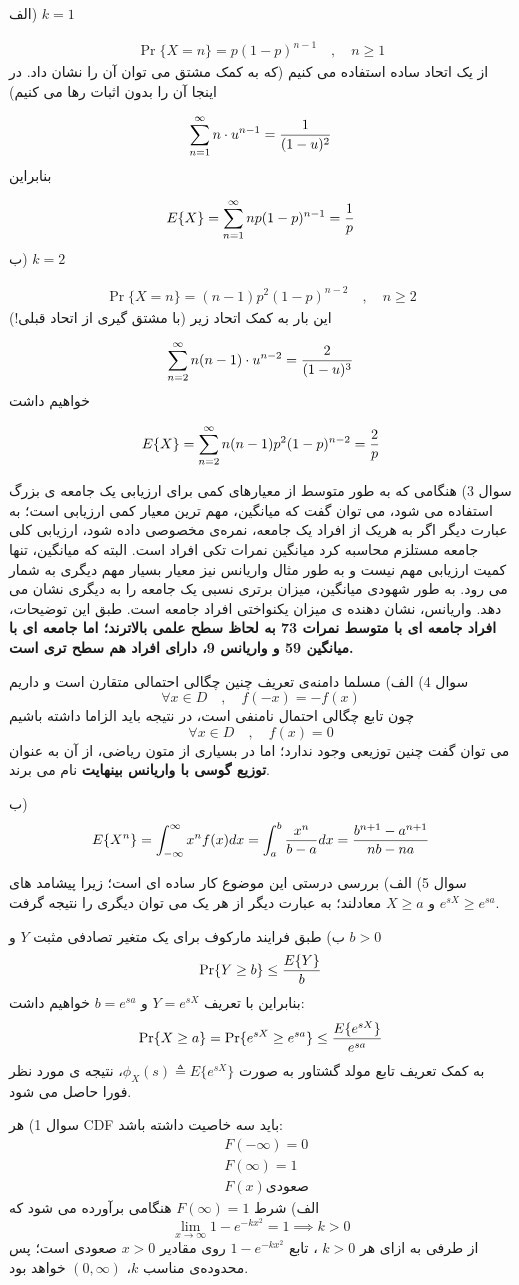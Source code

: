 \documentclass[10pt,letterpaper]{report}
\newcommand{\eqn}[1]{
\[\begin{split}
#1
\end{split}\]
}
\begin{document}
الف) $k=1$
\eqn{
\Pr\{X=n\}=p(1-p)^{n-1}\quad,\quad n\ge 1
}{}
از یک اتحاد ساده استفاده می کنیم (که به کمک مشتق می توان آن را نشان داد. در اینجا آن را بدون اثبات رها می کنیم)
\eqn{
\sum_{n=1}^\infty n\cdot u^{n-1}={1\over (1-u)^2}
}{}
بنابراین
\eqn{
E\{X\}=\sum_{n=1}^\infty np(1-p)^{n-1}={1\over p}
}{}
ب) $k=2$
\eqn{
\Pr\{X=n\}=(n-1)p^2(1-p)^{n-2}\quad,\quad n\ge 2
}{}
این بار به کمک اتحاد زیر (با مشتق گیری از اتحاد قبلی!)
\eqn{
\sum_{n=2}^\infty n(n-1)\cdot u^{n-2}={2\over (1-u)^3}
}{}
خواهیم داشت
\eqn{
E\{X\}=\sum_{n=2}^\infty n(n-1)p^2(1-p)^{n-2}={2\over p}
}{}

سوال 3) هنگامی که به طور متوسط از معیارهای کمی برای ارزیابی یک جامعه ی بزرگ استفاده می شود، می توان گفت که میانگین، مهم ترین معیار کمی ارزیابی است؛ به عبارت دیگر اگر به هریک از افراد یک جامعه، نمره‌ی مخصوصی داده شود، ارزیابی کلی جامعه مستلزم محاسبه کرد میانگین نمرات تکی افراد است. البته که میانگین، تنها کمیت ارزیابی مهم نیست و به طور مثال واریانس نیز معیار بسیار مهم دیگری به شمار می رود. به طور شهودی میانگین، میزان برتری نسبی یک جامعه را به دیگری نشان می دهد. واریانس، نشان دهنده ی میزان یکنواختی افراد جامعه است. طبق این توضیحات، 
\textbf{
افراد جامعه ای با متوسط نمرات 73 به لحاظ سطح علمی بالاترند؛ اما جامعه ای با میانگین 59 و واریانس 9، دارای افراد هم سطح تری است.
}

سوال 4) الف) مسلما دامنه‌ی تعریف چنین چگالی احتمالی متقارن است و داریم
$$
\forall x\in D\quad,\quad f(-x)=-f(x)
$$
چون تابع چگالی احتمال نامنفی است، در نتیجه باید الزاما داشته باشیم
$$
\forall x\in D\quad,\quad f(x)=0
$$
می توان گفت چنین توزیعی وجود ندارد؛ اما در بسیاری از متون ریاضی، از آن به عنوان 
\textbf{
توزیع گوسی با واریانس بینهایت
}
 نام می برند.

ب)
$$E\{X^n\}=\int_{-\infty}^\infty {x^n}f(x)dx=\int_{a}^b {x^n\over b-a}dx={b^{n+1}-a^{n+1}\over nb-na}$$

سوال 5)
 الف) بررسی درستی این موضوع کار ساده ای است؛ زیرا پیشامد های 
$e^{sX}\ge e^{sa}$
 و 
$X\ge a$
 معادلند؛ به عبارت دیگر از هر یک می توان دیگری را نتیجه گرفت.

ب) طبق فرایند مارکوف برای یک متغیر تصادفی مثبت $Y$ و $b>0$
$$\Pr\{Y\ge b\}\le{E\{Y\}\over b}$$
بنابراین با تعریف $Y=e^{sX}$ و $b=e^{sa}$ خواهیم داشت:
$$\Pr\{X\ge a\}=\Pr\{e^{sX}\ge e^{sa}\}\le{E\{e^{sX}\}\over e^{sa}}$$
به کمک تعریف تابع مولد گشتاور به صورت 
$\phi_X(s)\triangleq E\{e^{sX}\}$،
 نتیجه ی مورد نظر فورا حاصل می شود.

سوال 1) هر CDF باید سه خاصیت داشته باشد:
\[
\begin{split}
&F(-\infty)=0
\\&F(\infty)=1
\\&F(x) \text{صعودی}
\end{split}
\]
الف) شرط 
$F(\infty)=1$
هنگامی برآورده می شود که 
$$\lim_{x\to \infty}1-e^{-kx^2}=1\implies k>0$$
از طرفی به ازای هر
$
k>0
$
، تابع 
$
1-e^{-kx^2}
$
روی مقادیر 
$
x>0
$
صعودی است؛ پس محدوده‌ی مناسب $k$، 
$
(0,\infty)
$
خواهد بود.
\end{document}
